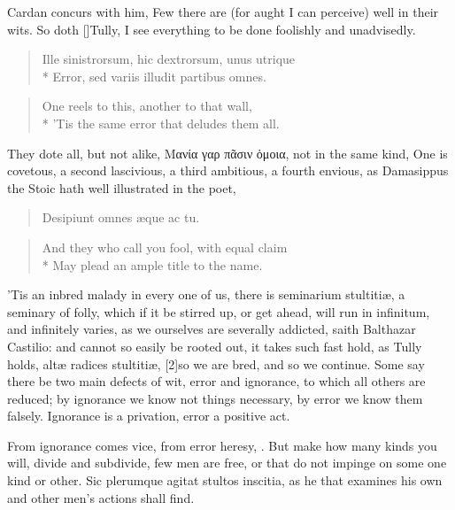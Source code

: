 { Cardan concurs with him, Few there are (for aught I can perceive)
well in their wits. So doth [\baselineskip]Tully, I see everything to be done
foolishly and unadvisedly.

\begin{verse}
\textlatin{Ille sinistrorsum, hic dextrorsum, unus utrique}\\*
\textlatin{Error, sed variis illudit partibus omnes.}
\end{verse}

\begin{verse}
One reels to this, another to that wall,\\*
'Tis the same error that deludes them all.
\end{verse}

They dote all, but not alike, Μανία γαρ πᾶσιν ὁμοια, not in the
same kind, One is covetous, a second lascivious, a third ambitious, a
fourth envious, \etc as Damasippus the Stoic hath well illustrated in
the poet,

\begin{verse}
\textlatin{Desipiunt omnes \ae{}que ac tu.}
\end{verse}

\begin{verse}
And they who call you fool, with equal claim\\*
May plead an ample title to the name.
\end{verse}

'Tis an inbred malady in every one of us, there is seminarium
stultiti\ae{}, a seminary of folly, which if it be stirred up, or get
ahead, will run in infinitum, and infinitely varies, as we ourselves
are severally addicted, saith Balthazar Castilio: and cannot so
easily be rooted out, it takes such fast hold, as Tully holds, alt\ae{}
radices stultiti\ae{}, [2\baselineskip]so we are bred, and so we continue. Some say
there be two main defects of wit, error and ignorance, to which all
others are reduced; by ignorance we know not things necessary, by error
we know them falsely. Ignorance is a privation, error a positive act.

From ignorance comes vice, from error heresy, \etc. But make how many
kinds you will, divide and subdivide, few men are free, or that do not
impinge on some one kind or other. Sic plerumque agitat stultos
inscitia, as he that examines his own and other men's actions shall
find.

}
